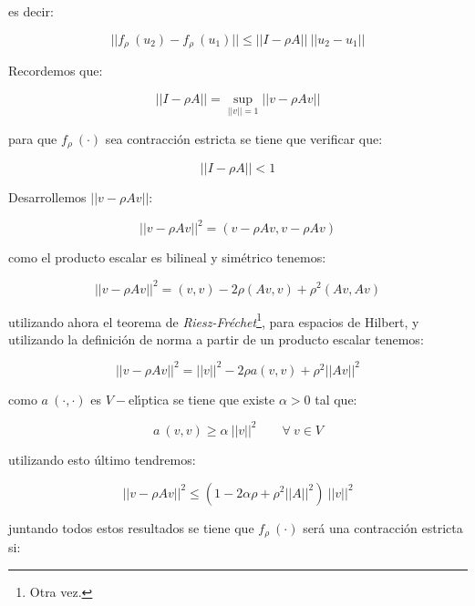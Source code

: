 \begin{demosteorema}
\begin{itemize}
es decir:

\begin{equation} \label{eq:existenciadesigualdad}
||f_{\rho}\ (u_2)-f_{\rho}\ (u_1)|| \le ||I -\rho A||\ ||u_2-u_1||
\end{equation}

Recordemos que:

\begin{equation} \label{eq:existencianorma}
||I-\rho A|| = \sup_{||v||=1} ||v-\rho Av||
\end{equation}

para que $f_{\rho}\ (\cdot )$ sea contracci\'on estricta se tiene que
verificar que:

\begin{displaymath}
||I-\rho A|| < 1
\end{displaymath}

Desarrollemos $||v-\rho Av||$:

\begin{displaymath}
||v-\rho Av||^2 =  (v-\rho Av, v-\rho Av)
\end{displaymath}

como el producto escalar es bilineal y sim\'etrico tenemos:

\begin{displaymath}
||v-\rho Av||^2 = (v,v)-2\rho (Av,v)+\rho^2 (Av,Av)
\end{displaymath}

utilizando ahora el teorema de \emph{Riesz-Fr\'echet}\footnote{Otra vez.},
para espacios de Hilbert, y utilizando la definici\'on de norma a partir de
un producto escalar tenemos:

\begin{displaymath}
||v-\rho Av||^2 = ||v||^2-2\rho a(v,v)+ \rho^2 ||Av||^2
\end{displaymath}

como $a\ (\cdot ,\cdot )$ es $V-$el\'{\i}ptica se tiene que existe $\alpha > 0$
tal que:

\begin{displaymath}
a\ (v,v) \ge \alpha \ ||v||^2 \qquad \forall \ v \in V
\end{displaymath}

utilizando esto \'ultimo tendremos:

\begin{displaymath}
||v-\rho Av||^2 \le (1-2\alpha \rho+\rho^2 ||A||^2)\ ||v||^2 
\end{displaymath}

juntando todos estos resultados se tiene que $f_{\rho}\ (\cdot )$ ser\'a 
una contracci\'on estricta si:


\end{itemize}
\end{demosteorema}
